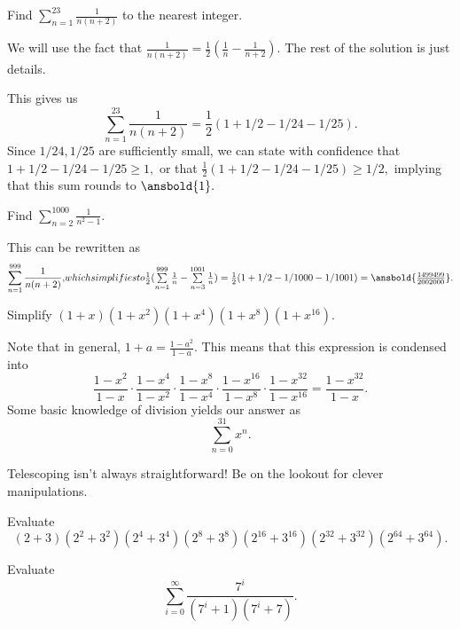 \documentclass[mast]{lucky}
\begin{document}
\begin{exam}
Find $\sum\limits_{n=1}^{23} \frac{1}{n(n+2)}$ to the nearest integer.
\end{exam}

\begin{sol}
We will use the fact that $\frac{1}{n(n+2)}=\frac{1}{2}(\frac{1}{n}-\frac{1}{n+2}).$ The rest of the solution is just details.

This gives us \[\sum\limits_{n=1}^{23} \frac{1}{n(n+2)}=\frac{1}{2}(1+1/2-1/24-1/25).\] Since $1/24,1/25$ are sufficiently small, we can state with confidence that $1+1/2-1/24-1/25\geq 1,$ or that $\frac{1}{2}(1+1/2-1/24-1/25) \geq 1/2,$ implying that this sum rounds to $\ansbold{1}.$
\end{sol}

\begin{exam}
Find $\sum\limits_{n=2}^{1000} \frac{1}{n^2-1}.$
\end{exam}

\begin{sol}
This can be rewritten as \[\sum\limits_{n=1}^{999}\frac{1}{n(n+2)},$$ which simplifies to $$\frac{1}{2}(\sum\limits_{n=1}^{999}\frac{1}{n}-\sum\limits_{n=3}^{1001}\frac{1}{n})=\frac{1}{2}(1+1/2-1/1000-1/1001)=\ansbold{\frac{1499499}{2002000}}.\]
\end{sol}

\begin{exam}
Simplify $(1+x)(1+x^2)(1+x^4)(1+x^8)(1+x^{16}).$
\end{exam}

\begin{sol}
Note that in general, $1+a=\frac{1-a^2}{1-a}.$ This means that this expression is condensed into \[\frac{1-x^2}{1-x}\cdot \frac{1-x^4}{1-x^2}\cdot \frac{1-x^8}{1-x^4}\cdot \frac{1-x^{16}}{1-x^8} \cdot \frac {1-x^{32}}{1-x^{16}}=\frac{1-{x^{32}}}{1-x}.\] Some basic knowledge of division yields our answer as \[\sum\limits_{n=0}^{31} x^n.\]
\end{sol}

Telescoping isn't always straightforward! Be on the lookout for clever manipulations.

\begin{exer}[AMC 10A 2021/10]
Evaluate
\[(2+3)(2^2+3^2)(2^4+3^4)(2^8+3^8)(2^{16}+3^{16})(2^{32}+3^{32})(2^{64}+3^{64}).\]
\end{exer}

\begin{exer}[CMIMC 2021/T3]
Evaluate \[\sum_{i=0}^{\infty}\frac{7^i}{(7^i+1)(7^i+7)}.\]
\end{exer}
\end{document}
